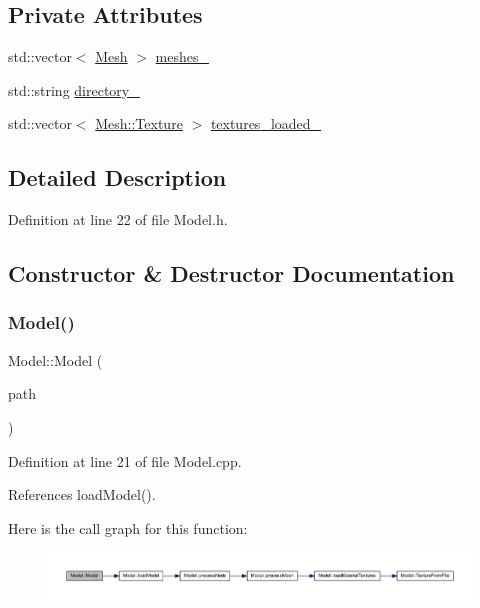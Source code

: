 \subsection*{Private Attributes}
\begin{DoxyCompactItemize}
\item 
std\+::vector$<$ \mbox{\hyperlink{classMesh}{Mesh}} $>$ \mbox{\hyperlink{classModel_afdaef518b8ca4c7d9f95fda34f6b8ac9}{meshes\+\_\+}}
\item 
std\+::string \mbox{\hyperlink{classModel_a2b8d86d272ebf7cd808a02b4d140ca12}{directory\+\_\+}}
\item 
std\+::vector$<$ \mbox{\hyperlink{structMesh_1_1Texture}{Mesh\+::\+Texture}} $>$ \mbox{\hyperlink{classModel_a92d229e44cb31a539ec4b5c7db977059}{textures\+\_\+loaded\+\_\+}}
\end{DoxyCompactItemize}


\subsection{Detailed Description}


Definition at line 22 of file Model.\+h.



\subsection{Constructor \& Destructor Documentation}
\mbox{\label{classModel_a97ced90b9b512521b2e5bdeaeac6b907}} 
\subsubsection{\texorpdfstring{Model()}{Model()}}
{\footnotesize\ttfamily Model\+::\+Model (\begin{DoxyParamCaption}\item[{const G\+Lchar $\ast$}]{path }\end{DoxyParamCaption})}



Definition at line 21 of file Model.\+cpp.



References load\+Model().

Here is the call graph for this function\+:\nopagebreak
\begin{figure}[H]
\begin{center}
\leavevmode
\includegraphics[width=350pt]{classModel_a97ced90b9b512521b2e5bdeaeac6b907_cgraph}
\end{center}
\end{figure}



